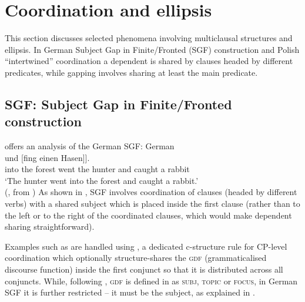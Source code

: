 \documentclass[output=paper]{../langscibook}
\begin{document}
\section{Coordination and ellipsis}
\label{sec:Coordination:ell}

This section discusses selected phenomena involving multiclausal
structures and ellipsis. In German Subject Gap in
Finite/Fronted (SGF) construction and Polish ``intertwined''
coordination a dependent is shared by clauses headed by different
predicates, while gapping involves sharing at
least the main predicate.

\subsection{SGF: Subject Gap in Finite/Fronted construction}
\label{sec:Coordination:ell:SGF}

\citet{fran:02} offers an analysis of the German SGF:
\ea\label{ex:cstr:fra:02:4}
    German\\\gll
      [[In den Wald ging der Jäger] und [fing einen Hasen]]. \\
      \phtm{[[}into the forest went the hunter and \phtm{[}caught a rabbit\\
\glt`The hunter went into the forest and caught a rabbit.' \\\hfill(\citealt[(4)]{fran:02}, from \citealt{Wunderlich1988})
\z
As shown in , SGF involves coordination of
clauses (headed by different verbs) with a shared subject which is
placed inside the first clause (rather than to the left or to the
right of the coordinated clauses, which would make dependent sharing
straightforward).

Examples such as  are handled using , a dedicated
c-structure rule for CP-level coordination which optionally
structure-shares the \textsc{gdf} (grammaticalised discourse
function) inside the first conjunct so that it is distributed across
all conjuncts. While, following \citet{bresnan2001lexical}, \textsc{gdf} is
defined in  as \textsc{subj}, \textsc{topic} or \textsc{focus}, in
German SGF it is further restricted – it must be the subject, as
explained in \citet{fran:02}.
\ea\label{ex:cstr:fra:02:35}
\z
\end{document}
